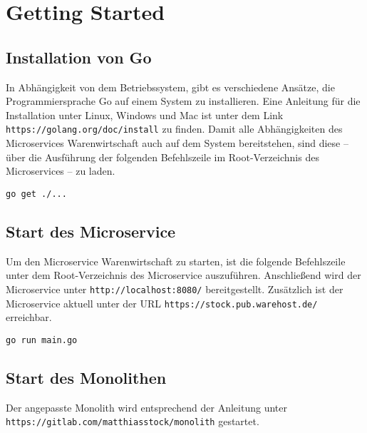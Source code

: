 \section{Getting Started}
\label{sec: Getting Started}

\subsection{Installation von Go}
In Abhängigkeit von dem Betriebssystem, gibt es verschiedene Ansätze, die Programmiersprache Go auf einem System zu installieren. Eine Anleitung für die Installation unter Linux, Windows und Mac ist unter dem Link \texttt{https://golang.org/doc/install} zu finden. Damit alle Abhängigkeiten des Microservices Warenwirtschaft auch auf dem System bereitstehen, sind diese -- über die Ausführung der folgenden Befehlszeile im Root-Verzeichnis des Microservices -- zu laden.
\begin{lstlisting}[caption=Laden der Abhängigkeiten]
go get ./...
\end{lstlisting}

\subsection{Start des Microservice}
Um den Microservice Warenwirtschaft zu starten, ist die folgende Befehlszeile unter dem Root-Verzeichnis des Microservice auszuführen. Anschließend wird der Microservice unter \linebreak \texttt{http://localhost:8080/} bereitgestellt. Zusätzlich ist der Microservice aktuell unter der URL \texttt{https://stock.pub.warehost.de/} erreichbar.
\begin{lstlisting}[caption=Start des Go-Microservice]
go run main.go
\end{lstlisting}

\subsection{Start des Monolithen}
Der angepasste Monolith wird entsprechend der Anleitung unter \linebreak \texttt{https://gitlab.com/matthiasstock/monolith} gestartet. 